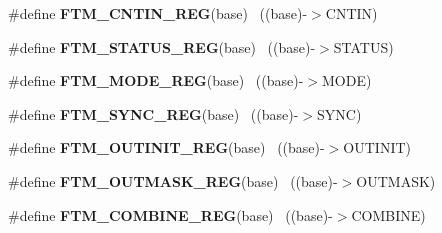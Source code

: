 \begin{DoxyCompactItemize}
\item 
\hypertarget{group___f_t_m___register___accessor___macros_ga2bac47a7c51c2e7f81edba5a00f949f2}{}\#define {\bfseries F\+T\+M\+\_\+\+C\+N\+T\+I\+N\+\_\+\+R\+E\+G}(base)                                        ~((base)-\/$>$C\+N\+T\+I\+N)\label{group___f_t_m___register___accessor___macros_ga2bac47a7c51c2e7f81edba5a00f949f2}

\item 
\hypertarget{group___f_t_m___register___accessor___macros_gae9cc2c8dd99da090bcbe0039637f4b0d}{}\#define {\bfseries F\+T\+M\+\_\+\+S\+T\+A\+T\+U\+S\+\_\+\+R\+E\+G}(base)                                      ~((base)-\/$>$S\+T\+A\+T\+U\+S)\label{group___f_t_m___register___accessor___macros_gae9cc2c8dd99da090bcbe0039637f4b0d}

\item 
\hypertarget{group___f_t_m___register___accessor___macros_ga2b015e87a081f48499ab1becb9c003c9}{}\#define {\bfseries F\+T\+M\+\_\+\+M\+O\+D\+E\+\_\+\+R\+E\+G}(base)                                          ~((base)-\/$>$M\+O\+D\+E)\label{group___f_t_m___register___accessor___macros_ga2b015e87a081f48499ab1becb9c003c9}

\item 
\hypertarget{group___f_t_m___register___accessor___macros_ga749433fea6be26b0ca61150ab722dca0}{}\#define {\bfseries F\+T\+M\+\_\+\+S\+Y\+N\+C\+\_\+\+R\+E\+G}(base)                                          ~((base)-\/$>$S\+Y\+N\+C)\label{group___f_t_m___register___accessor___macros_ga749433fea6be26b0ca61150ab722dca0}

\item 
\hypertarget{group___f_t_m___register___accessor___macros_ga689e5e15a9b7e64bb944251aeebafddc}{}\#define {\bfseries F\+T\+M\+\_\+\+O\+U\+T\+I\+N\+I\+T\+\_\+\+R\+E\+G}(base)                                    ~((base)-\/$>$O\+U\+T\+I\+N\+I\+T)\label{group___f_t_m___register___accessor___macros_ga689e5e15a9b7e64bb944251aeebafddc}

\item 
\hypertarget{group___f_t_m___register___accessor___macros_gaed9953404dbe94ee34e8a906489506c2}{}\#define {\bfseries F\+T\+M\+\_\+\+O\+U\+T\+M\+A\+S\+K\+\_\+\+R\+E\+G}(base)                                    ~((base)-\/$>$O\+U\+T\+M\+A\+S\+K)\label{group___f_t_m___register___accessor___macros_gaed9953404dbe94ee34e8a906489506c2}

\item 
\hypertarget{group___f_t_m___register___accessor___macros_ga3bd7d4b2370ee66201e8d9e87e416da0}{}\#define {\bfseries F\+T\+M\+\_\+\+C\+O\+M\+B\+I\+N\+E\+\_\+\+R\+E\+G}(base)                                    ~((base)-\/$>$C\+O\+M\+B\+I\+N\+E)\label{group___f_t_m___register___accessor___macros_ga3bd7d4b2370ee66201e8d9e87e416da0}


\end{DoxyCompactItemize}
